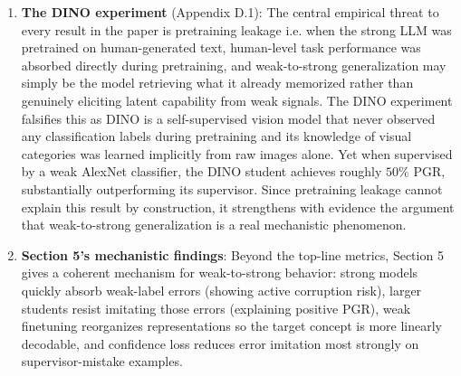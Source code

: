 \documentclass{article}
\begin{document}
\begin{enumerate}[leftmargin=*]
\item \textbf{The DINO experiment} (Appendix D.1): The central empirical threat to every result in the paper is pretraining leakage i.e. when the strong LLM was pretrained on human-generated text, human-level task performance was absorbed directly during pretraining, and weak-to-strong generalization may simply be the model retrieving what it already memorized rather than genuinely eliciting latent capability from weak signals. The DINO experiment falsifies this as DINO is a self-supervised vision model that never observed any classification labels during pretraining and its knowledge of visual categories was learned implicitly from raw images alone. Yet when supervised by a weak AlexNet classifier, the DINO student achieves roughly $50\%$ PGR, substantially outperforming its supervisor. Since pretraining leakage cannot explain this result by construction, it strengthens with evidence the argument that weak-to-strong generalization is a real mechanistic phenomenon.

  \item \textbf{Section 5's mechanistic findings}: Beyond the top-line metrics, Section 5 gives a coherent mechanism for weak-to-strong behavior: strong models quickly absorb weak-label errors (showing active corruption risk), larger students resist imitating those errors (explaining positive PGR), weak finetuning reorganizes representations so the target concept is more linearly decodable, and confidence loss reduces error imitation most strongly on supervisor-mistake examples.


\end{enumerate}
\end{document}
